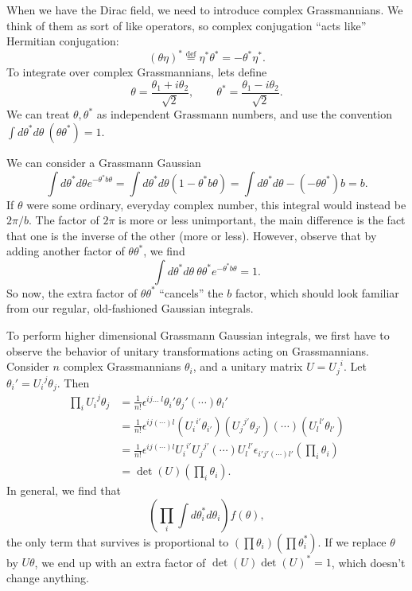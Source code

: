 When we have the Dirac field, we need to introduce complex
Grassmannians. We think of them as sort of like operators, so
complex conjugation ``acts like'' Hermitian conjugation:
\begin{equation}%
(\theta\eta)^{*}\stackrel{\text{def}}{=}\eta^{*}\theta^{*}=-\theta^{*}\eta^{*}.
\end{equation}
To integrate over complex Grassmannians, lets define
\begin{equation}%
\theta=\frac{\theta_{1}+i\theta_{2}}{\sqrt{2}},\qquad\theta^{*}=\frac{\theta_{1}-i\theta_{2}}{\sqrt{2}}.
\end{equation}
We can treat $\theta,\theta^{*}$ as independent Grassmann
numbers, and use the convention $\int d\theta^{*}d\theta
~(\theta\theta^{*})=1$.

We can consider a Grassmann Gaussian
\begin{equation}%
\int d\theta^{*}d\theta e^{-\theta^{*}b\theta} = \int
d\theta^{*}d\theta(1-\theta^{*}b\theta)=\int d\theta^{*}d\theta
-(-\theta\theta^{*})b = b.
\end{equation}
If $\theta$ were some ordinary, everyday complex number, this
integral would instead be $2\pi/b$. The factor of $2\pi$ is more
or less unimportant, the main difference is the fact that one is
the inverse of the other (more or less). However, observe that by
adding another factor of $\theta\theta^{*}$, we find
\begin{equation}%
\int d\theta^{*}d\theta ~\theta\theta^{*}e^{-\theta^{*}b\theta} = 1.
\end{equation}
So now, the extra factor of $\theta\theta^{*}$ ``cancels'' the
$b$ factor, which should look familiar from our regular,
old-fashioned Gaussian integrals.

To perform higher dimensional Grassmann Gaussian integrals, we
first have to observe the behavior of unitary transformations
acting on Grassmannians. Consider $n$ complex Grassmannians
$\theta_{i}$, and a unitary matrix $U={U_{j}}^{i}$. Let $\theta_{i}'={U_{i}}^{j}\theta_{j}$. Then
\begin{subequations}
\begin{align}
\prod_{i}{U_{i}}^{j}\theta_{j} &= \frac{1}{n!}\epsilon^{ij\ldots~l}\theta_{i}'\theta_{j}'(\cdots)\theta_{l}'\\
&= \frac{1}{n!}\epsilon^{ij(\cdots)l}({U_{i}}^{i'}\theta_{i'})({U_{j}}^{j'}\theta_{j'})(\cdots)({U_{l}}^{l'}\theta_{l'})\\
&= \frac{1}{n!}\epsilon^{ij(\cdots)l}{U_{i}}^{i'}{U_{j}}^{j'}(\cdots){U_{l}}^{l'}\epsilon_{i'j'(\cdots)l'}\left(\prod_{i}\theta_{i}\right)\\
&= \det(U)\left(\prod_{i}\theta_{i}\right).
\end{align}
\end{subequations}
In general, we find that
\begin{equation}%
\left(\prod_{i}\int d\theta^{*}_{i}d\theta_{i}\right)f(\theta),
\end{equation}
the only term that survives is proportional to $(\prod
\theta_{i})(\prod \theta^{*}_{i})$. If we replace $\theta$ by
$U\theta$, we end up with an extra factor of
$\det(U)\det(U)^{*}=1$, which doesn't change anything.

